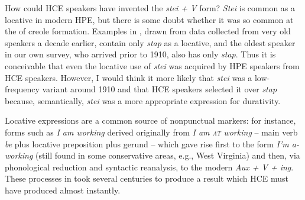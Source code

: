 How could HCE speakers have invented the \textit{stei + V} form? \textit{Stei} is common as a locative in modern HPE, but there is some doubt whether it was so common at the  of creole formation. Examples in \citet{Nagara1972}, drawn from data collected from very old speakers a decade earlier, contain only \textit{stap} as a locative, and the oldest speaker in our own survey, who arrived prior to 1910, also has only \textit{stap}. Thus it is conceivable that even the locative use of \textit{stei} was acquired by HPE speakers from HCE speakers. However, I would think it more likely that \textit{stei} was a low-frequency variant around 1910 and that HCE speakers selected it over \textit{stap} because, semantically, \textit{stei} was a more appropriate expression for durativity.

Locative expressions are a common source of nonpunctual markers: for instance, forms such as \textit{I am working} derived originally from \textit{I am \textsc{at} working} -- main verb \textit{be} plus locative preposition plus
gerund -- which gave rise first to the form \textit{I'm a-working} (still found in some conservative areas, e.g., West Virginia) and then, via phonological reduction and syntactic reanalysis, to the modern \textit{Aux + V + ing}. These processes in  took several centuries to produce a result which HCE must have produced almost instantly.

